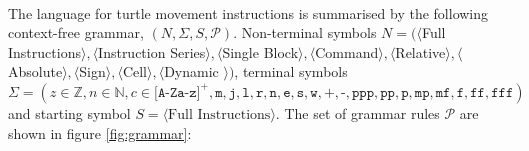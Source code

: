 \paragraph{} The language for turtle movement instructions is summarised by the following context-free grammar, $(N,\Sigma,S,\mathcal{P})$. Non-terminal symbols $N=(\langle$Full Instructions$\rangle, \langle$Instruction Series$\rangle, \langle$Single Block$\rangle, \langle$Command$\rangle, \langle$Relative$\rangle, \langle$Absolute$\rangle, \langle$Sign$\rangle, \langle$Cell$\rangle, \langle$Dynamic $\rangle)$, terminal symbols $\Sigma=(z{\in}\mathbb{Z}, n{\in}\mathbb{N}, c{\in}\texttt{[A-Za-z]}^{+}, \texttt{m}, \texttt{j}, \texttt{l}, \texttt{r}, \texttt{n}, \texttt{e}, \texttt{s}, \texttt{w}, \texttt{+}, \texttt{-}, \texttt{ppp}, \texttt{pp}, \texttt{p}, \texttt{mp}, \texttt{mf}, \texttt{f}, \texttt{ff}, \texttt{fff})$ and starting symbol $S = \langle \text{Full Instructions} \rangle$. The set of grammar rules $\mathcal{P}$ are shown in figure \ref{fig:grammar}:


